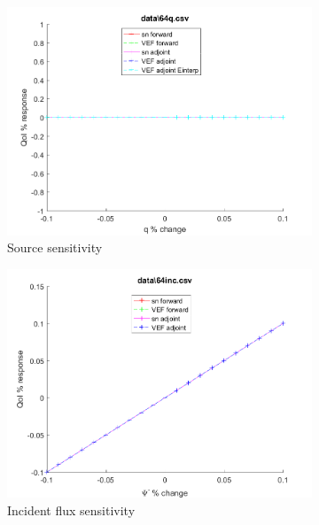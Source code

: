 \documentclass{article}
\begin{document}
\begin{figure}[H]
\label{Case64Sens}
\centering
\begin{subfigure}{.5\textwidth}
  \centering
  \includegraphics[width=.98\linewidth]{IanProposal/figures2/64qSens.png}
  \caption{Source sensitivity}
  \label{fig:sfig1}
\end{subfigure}%
\begin{subfigure}{.5\textwidth}
  \centering
  \includegraphics[width=.98\linewidth]{IanProposal/figures2/64incSens.png}
  \caption{Incident flux sensitivity}
  \label{fig:sfig4}
\end{subfigure}%
\\
\begin{subfigure}{.5\textwidth}
  \centering

\end{subfigure}
\end{figure}
\end{document}
